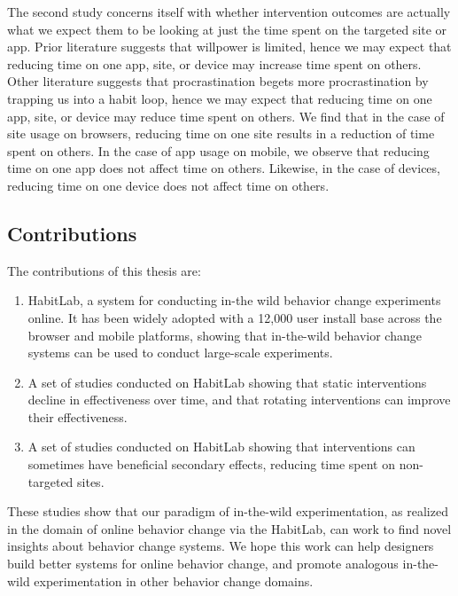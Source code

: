 The second study concerns itself with whether intervention outcomes are actually what we expect them to be looking at just the time spent on the targeted site or app. Prior literature suggests that willpower is limited, hence we may expect that reducing time on one app, site, or device may increase time spent on others. Other literature suggests that procrastination begets more procrastination by trapping us into a habit loop, hence we may expect that reducing time on one app, site, or device may reduce time spent on others. We find that in the case of site usage on browsers, reducing time on one site results in a reduction of time spent on others. In the case of app usage on mobile, we observe that reducing time on one app does not affect time on others. Likewise, in the case of devices, reducing time on one device does not affect time on others.


\subsection{Contributions}

The contributions of this thesis are:

\begin{enumerate}
\item HabitLab, a system for conducting in-the wild behavior change experiments online. It has been widely adopted with a 12,000 user install base across the browser and mobile platforms, showing that in-the-wild behavior change systems can be used to conduct large-scale experiments.
\item A set of studies conducted on HabitLab showing that static interventions decline in effectiveness over time, and that rotating interventions can improve their effectiveness.
\item A set of studies conducted on HabitLab showing that interventions can sometimes have beneficial secondary effects, reducing time spent on non-targeted sites.
\end{enumerate}


These studies show that our paradigm of in-the-wild experimentation, as realized in the domain of online behavior change via the HabitLab, can work to find novel insights about behavior change systems. We hope this work can help designers build better systems for online behavior change, and promote analogous in-the-wild experimentation in other behavior change domains.



